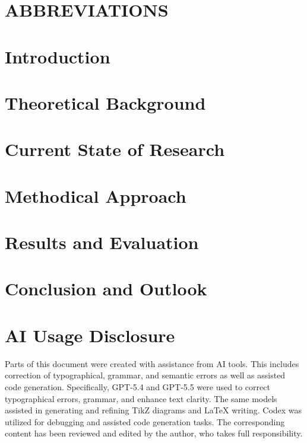 \documentclass[a4paper,12pt]{report}
\begin{document}
\setcounter{secnumdepth}{3}
\setcounter{tocdepth}{3}


\clearpage
\null
\thispagestyle{empty}
\clearpage
{}
\setcounter{page}{3}
\usefrontmatterstyle
\tableofcontents
\clearpage

\chapter*{ABBREVIATIONS}
{}

\clearpage

\usemainmatterstyle
\chapter{Introduction}


\chapter{Theoretical Background}


\chapter{Current State of Research}


\chapter{Methodical Approach}


\chapter{Results and Evaluation}


\chapter{Conclusion and Outlook}


\printbibliography[title={Bibliography}]

\clearpage
\chapter*{AI Usage Disclosure}
Parts of this document were created with assistance from AI tools. This includes correction of typographical, grammar, and semantic errors as well as assisted code generation. Specifically, GPT-5.4 and GPT-5.5 were used to correct typographical errors, grammar, and enhance text clarity. The same models assisted in generating and refining TikZ diagrams and \LaTeX{} writing. Codex was utilized for debugging and assisted code generation tasks. The corresponding content has been reviewed and edited by the author, who takes full responsibility.
\end{document}
